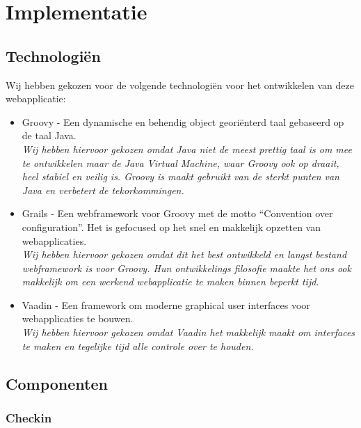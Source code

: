 \chapter{Implementatie}

\section{Technologi\"en}

Wij hebben gekozen voor de volgende technologi\"en voor het ontwikkelen van deze webapplicatie:
\begin{itemize}
	\item Groovy - Een dynamische en behendig object geori\"enterd taal gebaseerd op de taal Java.
	\vspace{2mm} \\
	\textit{Wij hebben hiervoor gekozen omdat Java niet de meest prettig taal is om mee te ontwikkelen maar de Java Virtual Machine, waar Groovy ook op draait, heel stabiel en veilig is. Groovy is maakt gebruikt van de sterkt punten van Java en verbetert de tekorkommingen.}

	\item Grails - Een webframework voor Groovy met de motto ``Convention over configuration''. Het is gefocused op het snel en makkelijk opzetten van webapplicaties.
	\vspace{2mm} \\
	\textit{Wij hebben hiervoor gekozen omdat dit het best ontwikkeld en langst bestand webframework is voor Groovy. Hun ontwikkelings filosofie maakte het ons ook makkelijk om een werkend webapplicatie te maken binnen beperkt tijd.}

	\item Vaadin - Een framework om moderne graphical user interfaces voor webapplicaties te bouwen.
	\vspace{2mm} \\
	\textit{Wij hebben hiervoor gekozen omdat Vaadin het makkelijk maakt om interfaces te maken en tegelijke tijd alle controle over te houden.}
\end{itemize}

\section{Componenten}

\subsection{Checkin}

